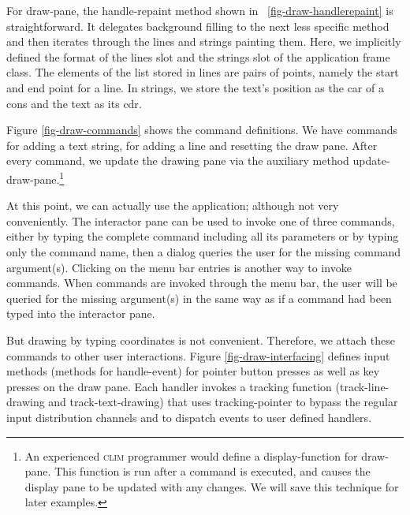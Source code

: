 \documentclass[twocolumn,a4paper]{article}
\newcommand {\code}[1]{{\sffamily #1}}
\newcommand {\CLIM}{\textsc{clim}}
\let\class\code
\let\method\code
\let\constant\code
\let\macro\code
\let\keyword\code
\begin{document}
For \class{draw-pane}, the \method{handle-repaint} method shown in
\figurename~\ref{fig-draw-handlerepaint} is straightforward. It
delegates background filling to the next less specific method and then
iterates through the lines and strings painting them. Here, we
implicitly defined the format of the \code{lines} slot and the
\code{strings} slot of the application frame class. The elements of
the list stored in \code{lines} are pairs of points, namely the start
and end point for a line. In \code{strings}, we store the text's
position as the \code{car} of a cons and the text as its \code{cdr}.



Figure \ref{fig-draw-commands} shows the command definitions. We have
commands for adding a text string, for adding a line and resetting the
draw pane. After every command, we update the drawing pane via the
auxiliary method \method{update-draw-pane}.\footnote{An experienced
\CLIM{} programmer would define a display-function for
\class{draw-pane}. This function is run after a command is
executed, and causes the display pane to be updated with any changes. We 
will save this technique for later examples.}

At this point, we can actually use the application; although not very
conveniently. The interactor pane can be used to invoke one of three
commands, either by typing the complete command including all its
parameters or by typing only the command name, then a dialog queries
the user for the missing command argument(s). Clicking on the menu bar
entries is another way to invoke commands.  When commands are invoked
through the menu bar, the user will be queried for the missing
argument(s) in the same way as if a command had been typed into the
interactor pane.

But drawing by typing coordinates is not convenient. Therefore, we
attach these commands to other user interactions.  Figure
\ref{fig-draw-interfacing} defines input methods (methods for
\code{handle-event}) for pointer button
presses as well as key presses on the draw pane.  
Each handler invokes a tracking function (\code{track-line-drawing} and
\code{track-text-drawing}) that uses \macro{tracking-pointer} to
bypass the regular input distribution channels and to dispatch events
to user defined handlers.
\end{document}
